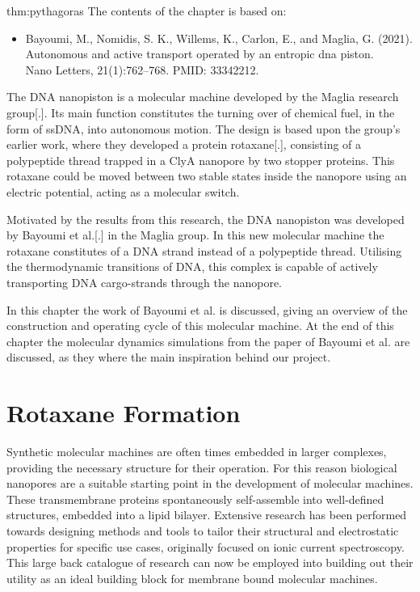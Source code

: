 
\begin{theo}{thm:pythagoras}
  The contents of the chapter is based on:
  \vspace{-0.4cm}
  \begin{itemize}
    \item Bayoumi, M., Nomidis, S. K., Willems, K., Carlon, E., and Maglia, G. (2021).
      Autonomous and active transport operated by an entropic dna piston.\\
      Nano Letters, 21(1):762–768. PMID: 33342212.
  \end{itemize}
  \vspace{0.3cm}
\end{theo}

The DNA nanopiston is a molecular machine developed by the Maglia research group[.].  Its
main function constitutes the turning over of chemical fuel, in the form of ssDNA,  into
autonomous motion. The design is based upon the group's earlier work, where they
developed a protein rotaxane[.], consisting of a polypeptide thread trapped in a ClyA
nanopore by two stopper proteins. This rotaxane could be moved between two stable states
inside the nanopore using an electric potential, acting as a molecular switch.

Motivated by the results from this research, the DNA nanopiston was developed by Bayoumi
et al.[.] in the Maglia group. In this new molecular machine the rotaxane constitutes of
a DNA strand instead of a polypeptide thread. Utilising the thermodynamic transitions of
DNA, this complex is capable of actively transporting DNA cargo-strands through the
nanopore.

In this chapter the work of Bayoumi et al. is discussed, giving an overview of the
construction and operating cycle of this molecular machine.  At the end of this chapter
the molecular dynamics simulations from the paper of Bayoumi et al. are discussed, as
they where the main inspiration behind our project.

\section{Rotaxane Formation}


Synthetic molecular machines are often times embedded in larger complexes, providing the
necessary structure for their operation. For this reason biological nanopores are a
suitable starting point in the development of molecular machines. These transmembrane
proteins spontaneously self-assemble into well-defined structures, embedded into a lipid
bilayer. Extensive research has been performed towards designing methods and tools to
tailor their structural and electrostatic properties for specific use cases, originally
focused on ionic current spectroscopy. This large back catalogue of research can now be
employed into building out their utility as an ideal building block for membrane bound
molecular machines.

